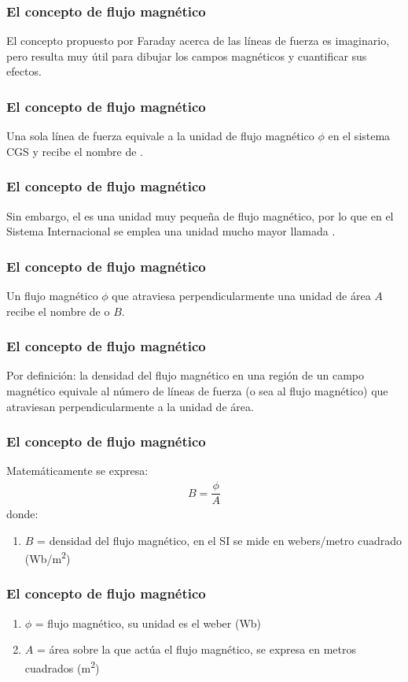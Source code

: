 \documentclass[14pt]{beamer}
\begin{document}
\begin{frame}
\frametitle{El concepto de flujo magnético}
El concepto propuesto por Faraday acerca de las líneas de fuerza es imaginario, pero resulta muy útil para dibujar los campos magnéticos y cuantificar sus efectos.
\end{frame}
\begin{frame}
\frametitle{El concepto de flujo magnético}
Una sola línea de fuerza equivale a la unidad de flujo magnético $\phi$ en el sistema CGS y recibe el nombre de .
\end{frame}
\begin{frame}
\frametitle{El concepto de flujo magnético}
Sin embargo, el  es una unidad muy pequeña de flujo magnético, \pause por lo que en el Sistema Internacional se emplea una unidad mucho mayor llamada .
\end{frame}
\begin{frame}
\frametitle{El concepto de flujo magnético}
Un flujo magnético $\phi$ que atraviesa perpendicularmente una unidad de área $A$ recibe el nombre de  o  $B$.
\end{frame}
\begin{frame}
\frametitle{El concepto de flujo magnético}
Por definición: la densidad del flujo magnético en una región de un campo magnético equivale al número de líneas de fuerza (o sea al flujo magnético) que atraviesan perpendicularmente a la unidad de área.
\end{frame}
\begin{frame}
\frametitle{El concepto de flujo magnético}
Matemáticamente se expresa:
\pause
\begin{align*}
B = \dfrac{\phi}{A}
\end{align*}
donde:
\begin{enumerate}[<+->]
\item $B$ = densidad del flujo magnético, en el SI se mide en webers/metro cuadrado (Wb/\unit{\square\meter})
\seti
\end{enumerate}
\end{frame}
\begin{frame}
\frametitle{El concepto de flujo magnético}
\begin{enumerate}[<+->]
\conti
\item $\phi$ = flujo magnético, su unidad es el weber (Wb)
\item $A$ = área sobre la que actúa el flujo magnético, se expresa en metros cuadrados (\unit{\square\meter})
\end{enumerate}
\end{frame}
\end{document}
